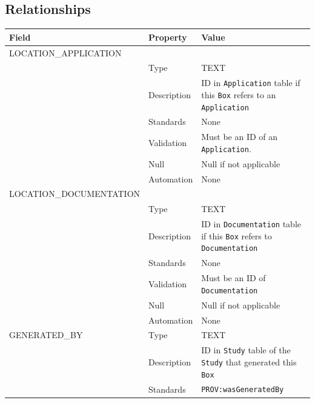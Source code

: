 \documentclass[
]{article}
\newcounter{none} %
\begin{document}
\subsection{Relationships}\label{relationships-4}

{\def\LTcaptype{none} %
\begin{longtable}[]{@{}
  >{\raggedright\arraybackslash}p{}
  >{\raggedright\arraybackslash}p{}
  >{\raggedright\arraybackslash}p{}@{}}
\toprule\noalign{}
\begin{minipage}[b]{\linewidth}\raggedright
Field
\end{minipage} & \begin{minipage}[b]{\linewidth}\raggedright
Property
\end{minipage} & \begin{minipage}[b]{\linewidth}\raggedright
Value
\end{minipage} \\
\midrule\noalign{}
\endhead
\bottomrule\noalign{}
\endlastfoot
LOCATION\_APPLICATION & & \\
& Type & TEXT \\
& Description & ID in \texttt{Application} table if this \texttt{Box}
refers to an \texttt{Application} \\
& Standards & None \\
& Validation & Must be an ID of an \texttt{Application}. \\
& Null & Null if not applicable \\
& Automation & None \\
LOCATION\_DOCUMENTATION & & \\
& Type & TEXT \\
& Description & ID in \texttt{Documentation} table if this \texttt{Box}
refers to \texttt{Documentation} \\
& Standards & None \\
& Validation & Must be an ID of \texttt{Documentation} \\
& Null & Null if not applicable \\
& Automation & None \\
GENERATED\_BY & Type & TEXT \\
& Description & ID in \texttt{Study} table of the \texttt{Study} that
generated this \texttt{Box} \\
& Standards & \texttt{PROV:wasGeneratedBy} \\

\end{longtable}}
\end{document}
